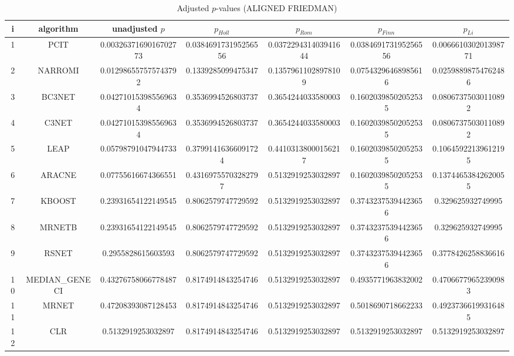 \documentclass[a4paper,10pt]{article}
\begin{document}
\begin{landscape}
\begin{table}[!htp]
\centering\scriptsize
\caption{Adjusted $p$-values (ALIGNED FRIEDMAN)}
\begin{tabular}{ccccccc}
i&algorithm&unadjusted $p$&$p_{Holl}$&$p_{Rom}$&$p_{Finn}$&$p_{Li}$\\
\hline
1&PCIT&0.0032637169016702773&0.038469173195256556&0.037229431403941644&0.038469173195256556&0.006661030201398771\\
2&NARROMI&0.012986557575743792&0.1339285099475347&0.13579611028978109&0.07543296468985616&0.02598898754762486\\
3&BC3NET&0.042710153985569634&0.3536994526803737&0.3654244033580003&0.16020398502052535&0.08067375030110892\\
4&C3NET&0.042710153985569634&0.3536994526803737&0.3654244033580003&0.16020398502052535&0.08067375030110892\\
5&LEAP&0.05798791047944733&0.37991416366091724&0.44103138000156217&0.16020398502052535&0.10645922139612195\\
6&ARACNE&0.07755616674366551&0.43169755703282797&0.5132919253032897&0.16020398502052535&0.13744653842620055\\
7&KBOOST&0.23931654122149545&0.8062579747729592&0.5132919253032897&0.37432375394423656&0.329625932749995\\
8&MRNETB&0.23931654122149545&0.8062579747729592&0.5132919253032897&0.37432375394423656&0.329625932749995\\
9&RSNET&0.2955828615603593&0.8062579747729592&0.5132919253032897&0.37432375394423656&0.3778426258836616\\
10&MEDIAN_GENECI&0.43276758066778487&0.8174914843254746&0.5132919253032897&0.4935771963832002&0.47066779652390983\\
11&MRNET&0.47208393087128453&0.8174914843254746&0.5132919253032897&0.5018690718662233&0.49237366199316485\\
12&CLR&0.5132919253032897&0.8174914843254746&0.5132919253032897&0.5132919253032897&0.5132919253032897\\
\hline
\end{tabular}
\end{table}


\newpage


\end{landscape}
\end{document}
